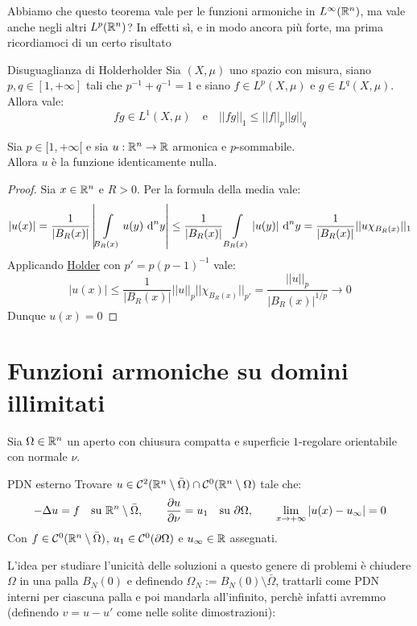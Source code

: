 \documentclass{book}
\begin{document}
Abbiamo che questo teorema vale per le funzioni armoniche in $L^\infty(\mathbb{R}^n)$, ma vale anche negli altri $L^p(\mathbb{R}^n)$? In effetti sì, e in modo ancora più forte, ma prima ricordiamoci di un certo risultato

\begin{lemma}{Disuguaglianza di Holder}{holder}
    Sia $(X,\mu)$ uno spazio con misura, siano $p,q \in [1,+\infty]$ tali che $p^{-1}+q^{-1}= 1$ e siano $f\in L^p(X,\mu)$ e $g \in L^q(X,\mu)$. Allora vale:
    \[f g \in L^1(X,\mu) \quad \text{e}\quad ||fg||_1 \le ||f||_p||g||_q\]
\end{lemma}

\begin{theorem}{}{}
    Sia $p \in [1,+\infty[$ e sia $u:\mathbb{R}^n\to\mathbb{R}$ armonica e $p$-sommabile.\\
    Allora $u$ è la funzione identicamente nulla.
\end{theorem}
\begin{proof}
    Sia $x \in \mathbb{R}^n$ e $R>0$. Per la formula della media vale:
    \[|u(x)| = \frac{1}{|B_R(x)|}\left| \int\limits_{B_R(x)} u(y)\text{ d}^n y\right| \le \frac{1}{|B_R(x)|}\int\limits_{B_R(x)} |u(y)|\text{ d}^n y = \frac{1}{|B_R(x)|} ||u \chi_{B_R(x)}||_1\]
    Applicando \href{lemma:holder}{Holder} con $p' = p(p-1)^{-1}$ vale:
    \[|u(x)|\le \frac{1}{|B_R(x)|} ||u||_p ||\chi_{B_R(x)}||_{p'} = \frac{||u||_p}{|B_R(x)|^{1/p}} \to 0\]
    Dunque $u(x) = 0$
\end{proof}

\section{Funzioni armoniche su domini illimitati}

Sia $\Omega \in \mathbb{R}^n$ un aperto con chiusura compatta e superficie $1$-regolare orientabile con normale $\nu$.

\begin{definition}{PDN esterno}{}
    Trovare $u\in \mathcal{C}^2(\mathbb{R}^n\setminus \bar{\Omega})\cap \mathcal{C}^0(\mathbb{R}^n\setminus\Omega)$ tale che:
    \[-\Delta u = f \quad \text{su }\mathbb{R}^n\setminus\bar{\Omega}, \qquad \frac{\partial u}{\partial \nu} = u_1 \quad \text{su }\partial\Omega, \qquad \lim_{x\to+\infty} |u(x)-u_\infty| = 0 \]
    Con $f \in \mathcal{C}^0(\mathbb{R}^n\setminus\bar{\Omega})$, $u_1 \in \mathcal{C}^0(\partial\Omega)$ e $u_\infty\in\mathbb{R}$ assegnati. 
\end{definition}

L'idea per studiare l'unicità delle soluzioni a questo genere di problemi è chiudere $\Omega$ in una palla $B_N(0)$ e definendo $\Omega_N := B_N(0) \setminus \bar{\Omega }$, trattarli come PDN interni per ciascuna palla e poi mandarla all'infinito, perchè infatti avremmo (definendo $v = u-u'$ come nelle solite dimostrazioni):
\end{document}

